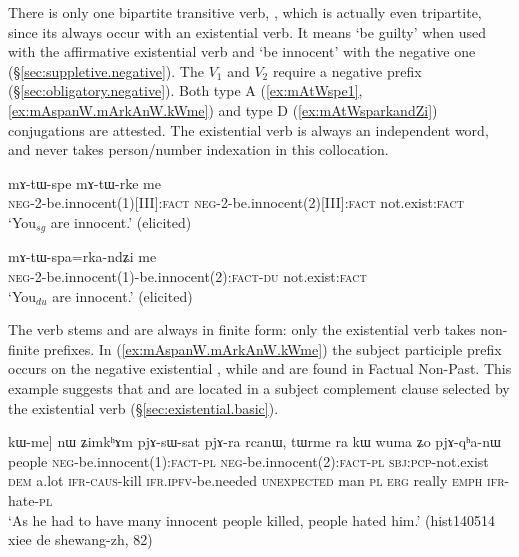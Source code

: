 There is only one bipartite transitive verb, , which is actually even tripartite, since its always occur with an existential verb. It means `be guilty' when used with the affirmative existential verb  and  `be innocent' with the negative one  (§\ref{sec:suppletive.negative}). The $V_1$ and $V_2$ require a negative prefix (§\ref{sec:obligatory.negative}). Both type A (\ref{ex:mAtWspe1}, \ref{ex:mAspanW.mArkAnW.kWme}) and type D (\ref{ex:mAtWsparkandZi}) conjugations are attested. The existential verb is always an independent word, and never takes person/number indexation in this collocation. 

\begin{exe}
\ex \label{ex:mAtWspe1}
\gll  mɤ-tɯ-spe mɤ-tɯ-rke me \\
\textsc{neg}-2-be.innocent(1)[III]:\textsc{fact} \textsc{neg}-2-be.innocent(2)[III]:\textsc{fact} not.exist:\textsc{fact} \\
\glt `You$_{sg}$ are innocent.' (elicited)
\end{exe} 
 
\begin{exe}
\ex \label{ex:mAtWsparkandZi}
\gll  mɤ-tɯ-spa=rka-ndʑi me  \\
\textsc{neg}-2-be.innocent(1)-be.innocent(2):\textsc{fact}-\textsc{du} not.exist:\textsc{fact} \\
\glt `You$_{du}$ are innocent.' (elicited)
\end{exe} 

The verb stems  and  are always in finite form: only the existential verb takes non-finite prefixes. In (\ref{ex:mAspanW.mArkAnW.kWme}) the subject participle prefix  occurs on the negative existential , while   and  are found in Factual Non-Past. This example suggests that   and  are located in a subject complement clause selected by the existential verb (§\ref{sec:existential.basic}).

  \begin{exe}
\ex \label{ex:mAspanW.mArkAnW.kWme}
\gll [mkʰɤrmaŋ [mɤ-spa-nɯ mɤ-rka-nɯ] kɯ-me] nɯ ʑimkʰɤm pjɤ-sɯ-sat pjɤ-ra rcanɯ, tɯrme ra kɯ wuma ʑo pjɤ-qʰa-nɯ  \\
people \textsc{neg}-be.innocent(1):\textsc{fact}-\textsc{pl} \textsc{neg}-be.innocent(2):\textsc{fact}-\textsc{pl} \textsc{sbj}:\textsc{pcp}-not.exist \textsc{dem} a.lot \textsc{ifr}-\textsc{caus}-kill \textsc{ifr}.\textsc{ipfv}-be.needed \textsc{unexpected} man \textsc{pl} \textsc{erg} really \textsc{emph} \textsc{ifr}-hate-\textsc{pl} \\
 \glt `As he had to have many innocent people killed, people hated him.' (hist140514 xiee de shewang-zh, 82)
\end{exe} 
  
